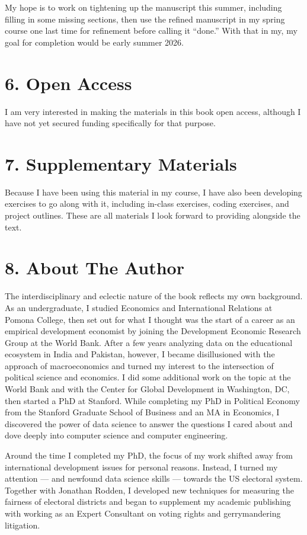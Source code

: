 \documentclass[12pt]{article}
\begin{document}
My hope is to work on tightening up the manuscript this summer,
including filling in some missing sections, then use the refined
manuscript in my spring course one last time for refinement before
calling it ``done.'' With that in my, my goal for completion would be
early summer 2026.

\section*{6. Open Access}\label{open-access}

I am very interested in making the materials in this book open access,
although I have not yet secured funding specifically for that purpose.

\section*{7. Supplementary Materials}\label{supplementary-materials}

Because I have been using this material in my course, I have also been
developing exercises to go along with it, including in-class exercises,
coding exercises, and project outlines. These are all materials I look
forward to providing alongside the text.

\section*{8. About The Author}\label{about-the-author}

The interdisciplinary and eclectic nature of the book reflects my own
background. As an undergraduate, I studied Economics and International
Relations at Pomona College, then set out for what I thought was the
start of a career as an empirical development economist by joining the
Development Economic Research Group at the World Bank. After a few years
analyzing data on the educational ecosystem in India and Pakistan,
however, I became disillusioned with the approach of macroeconomics and
turned my interest to the intersection of political science and
economics. I did some additional work on the topic at the World Bank and
with the Center for Global Development in Washington, DC, then started a
PhD at Stanford. While completing my PhD in Political Economy from the
Stanford Graduate School of Business and an MA in Economics, I
discovered the power of data science to answer the questions I cared
about and dove deeply into computer science and computer engineering.

Around the time I completed my PhD, the focus of my work shifted away
from international development issues for personal reasons. Instead, I
turned my attention --- and newfound data science skills --- towards the
US electoral system. Together with Jonathan Rodden, I developed new
techniques for measuring the fairness of electoral districts and began
to supplement my academic publishing with working as an Expert
Consultant on voting rights and gerrymandering litigation.
\end{document}
